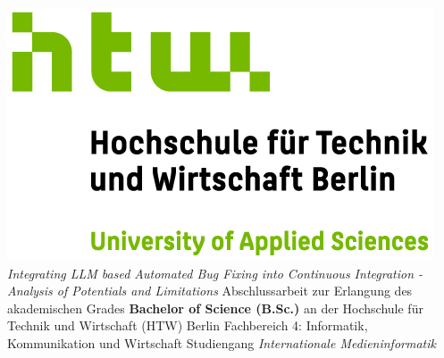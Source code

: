 
\begin{titlepage}
    \begin{center}
        \includegraphics{images/HTW_Berlin_Logo_farbig.jpg}
        \linebreak[4]
        \linebreak[4]
        \linebreak[4]
        \linebreak[4]
        \textit{\large Integrating LLM based Automated Bug Fixing into Continuous Integration - Analysis of Potentials and Limitations}
        \linebreak[4]
        \linebreak[4]
        \linebreak[4]
        Abschlussarbeit
        \linebreak[4]
        \linebreak[4]
        zur Erlangung des akademischen Grades
        \linebreak[4]
        \linebreak[4]
        \textbf{Bachelor of Science (B.Sc.)}
        \linebreak[4]
        \linebreak[4]
        an der
        \linebreak[4]
        \linebreak[4]
        Hochschule f\"ur Technik und Wirtschaft (HTW) Berlin
        \linebreak[4]
        Fachbereich 4: Informatik, Kommunikation und Wirtschaft
        \linebreak[4]
        Studiengang \textit{Internationale Medieninformatik}
        \linebreak[4]
        \linebreak[4]
        \linebreak[4]

\end{center}
\end{titlepage}
